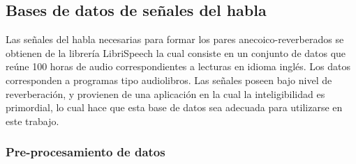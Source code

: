 \subsection{Bases de datos de señales del habla}

Las señales del habla necesarias para formar los pares anecoico-reverberados se obtienen de la librería LibriSpeech \cite{librispeech} la cual consiste en un conjunto de datos que reúne 100 horas de audio correspondientes a lecturas en idioma inglés. Los datos corresponden a programas tipo audiolibros. Las señales poseen bajo nivel de reverberación, y provienen de una aplicación en la cual la inteligibilidad es primordial, lo cual hace que esta base de datos sea adecuada para utilizarse en este trabajo.

\subsubsection{Pre-procesamiento de datos}

